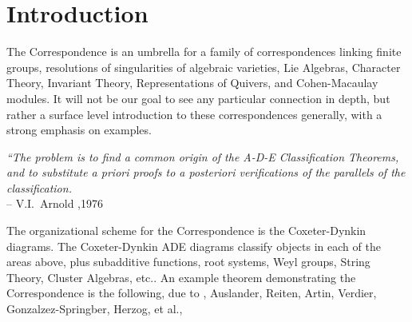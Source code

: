 \newpage
\section{Introduction}


The \mc Correspondence is an umbrella for a family of correspondences linking finite groups, resolutions of singularities of algebraic varieties, Lie Algebras, Character Theory, Invariant Theory, Representations of Quivers, and Cohen-Macaulay modules. It will not be our goal to see any particular connection in depth, but rather a surface level introduction to these correspondences generally, with a strong emphasis on examples. \\

        \begin{nscenter}
        \begin{minipage}{0.8\textwidth}
        {\itshape ``The problem is to find a common origin of the A-D-E Classification Theorems, and to substitute a priori proofs to a posteriori verifications of the parallels of the classification.} \\
        \phantom{x}\hspace{1cm} -- V.I.~Arnold ,1976 \\
        \end{minipage}
        \end{nscenter}

The organizational scheme for the \mc Correspondence is the Coxeter-Dynkin diagrams. The Coxeter-Dynkin ADE diagrams classify objects in each of the areas above, plus subadditive functions, root systems, Weyl groups, String Theory, Cluster Algebras, etc.. An example theorem demonstrating the \mc Correspondence is the following, due to \mc, Auslander, Reiten, Artin, Verdier, Gonzalzez-Springber, Herzog, et al.,


